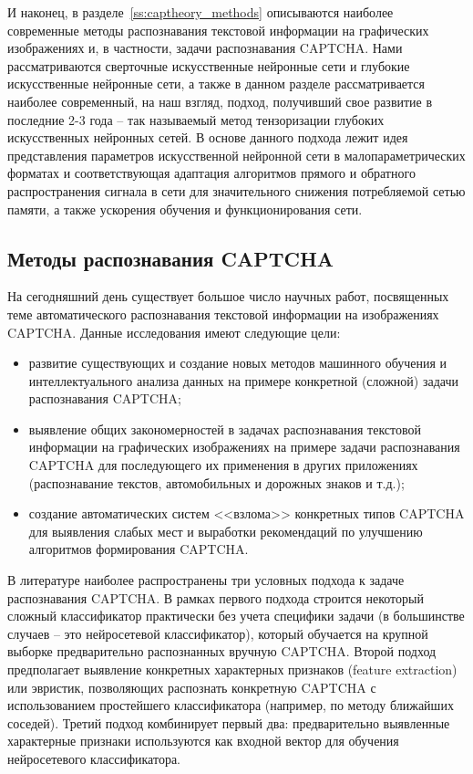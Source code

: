 \documentclass[a4paper,12pt,russian]{article} %
\begin{document}
И наконец, в разделе~\ref{ss:captheory_methods} описываются наиболее современные методы  распознавания текстовой информации на графических изображениях и, в частности, задачи распознавания CAPTCHA.
Нами рассматриваются сверточные искусственные нейронные сети и глубокие искусственные нейронные сети, а также в данном разделе рассматривается наиболее современный, на наш взгляд, подход, получивший свое развитие в последние 2-3 года -- так называемый метод тензоризации глубоких искусственных нейронных сетей.
В основе данного подхода лежит идея представления параметров искусственной нейронной сети в малопараметрических форматах и соответствующая адаптация алгоритмов прямого и обратного распространения сигнала в сети для значительного снижения потребляемой сетью памяти, а также ускорения обучения и функционирования сети.

\newpage
\subsection{Методы распознавания CAPTCHA} \label{ss:captheory_alg}

На сегодняшний день существует большое число научных работ, посвященных теме автоматического распознавания текстовой информации на изображениях CAPTCHA.
Данные исследования имеют следующие цели:
\begin{itemize}
	\item развитие существующих и создание новых методов машинного обучения и интеллектуального анализа данных на примере конкретной (сложной) задачи распознавания CAPTCHA;
	\item выявление общих закономерностей в задачах распознавания текстовой информации на графических изображениях на примере задачи распознавания CAPTCHA для последующего их применения в других приложениях (распознавание текстов, автомобильных и дорожных знаков и т.д.);
	\item создание автоматических систем <<взлома>> конкретных типов CAPTCHA для выявления слабых мест и выработки рекомендаций по улучшению алгоритмов формирования CAPTCHA.
\end{itemize}

В литературе наиболее распространены три условных подхода к задаче распознавания CAPTCHA.
В рамках первого подхода строится некоторый сложный классификатор практически без учета специфики задачи (в большинстве случаев -- это нейросетевой классификатор), который обучается на крупной выборке предварительно распознанных вручную CAPTCHA.
Второй подход предполагает выявление конкретных характерных признаков (feature extraction) или эвристик, позволяющих распознать конкретную CAPTCHA с использованием простейшего классификатора (например, по методу ближайших соседей).
Третий подход комбинирует первый два: предварительно выявленные характерные признаки используются как входной вектор для обучения нейросетевого классификатора.
\end{document}
